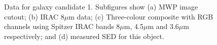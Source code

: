\documentclass[times,usenatbib]{mn2e}
\begin{document}
\begin{figure}
\begin{center}
\caption{Data for galaxy candidate 1. Subfigures show (a) MWP image cutout; (b) IRAC 8$\mu$m data; (c) Three-colour composite with RGB channels using Spitzer IRAC bands 8$\mu$m, 4.5$\mu$m and 3.6$\mu$m respectively; and (d) measured SED for this object.}
\label{gal1}
\end{center}
\end{figure} 
\end{document}
